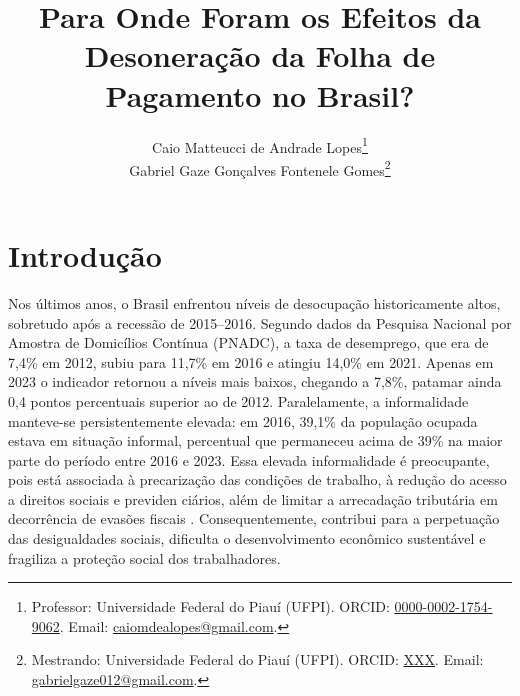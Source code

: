 \documentclass[12pt,a4paper,oneside]{article}
\date{}
\begin{document}
	\title{Para Onde Foram os Efeitos da Desoneração da Folha de Pagamento no Brasil?}

\author{
	Caio Matteucci de Andrade Lopes\thanks{Professor: Universidade Federal do Piauí (UFPI). ORCID: \href{https://orcid.org/0000-0002-1754-9062}{0000-0002-1754-9062}. Email: \href{mailto:caiomdealopes@gmail.com}{caiomdealopes@gmail.com}.} \\
	Gabriel Gaze Gonçalves Fontenele Gomes\thanks{Mestrando: Universidade Federal do Piauí (UFPI). ORCID: \href{https://XXX}{XXX}. Email: \href{mailto:gabrielgaze012@gmail.com}{gabrielgaze012@gmail.com}.} \\
}	
	\def \theforeigntitle{}
	
	\maketitle


		 
	
		
		

			 			 

		
		
		\section{Introdução}
		
		
		Nos últimos anos, o Brasil enfrentou níveis de desocupação historicamente altos, sobretudo após a recessão de 2015–2016. Segundo dados da Pesquisa Nacional por Amostra de
		Domicílios Contínua (PNADC), a taxa de desemprego, que era de 7,4\% em 2012, subiu para
		11,7\% em 2016 e atingiu 14,0\% em 2021. Apenas em 2023 o indicador retornou a níveis mais
		baixos, chegando a 7,8\%, patamar ainda 0,4 pontos percentuais superior ao de 2012. Paralelamente, a informalidade manteve-se persistentemente elevada: em 2016, 39,1\% da população
		ocupada estava em situação informal, percentual que permaneceu acima de 39\% na maior parte
		do período entre 2016 e 2023. Essa elevada informalidade é preocupante, pois está associada
		à precarização das condições de trabalho, à redução do acesso a direitos sociais e previden
		ciários, além de limitar a arrecadação tributária em decorrência de evasões fiscais \citep{pellizzaro2024}. Consequentemente, contribui para a perpetuação das desigualdades sociais, dificulta o desenvolvimento econômico sustentável e fragiliza a proteção social dos trabalhadores.
		
\end{document}
